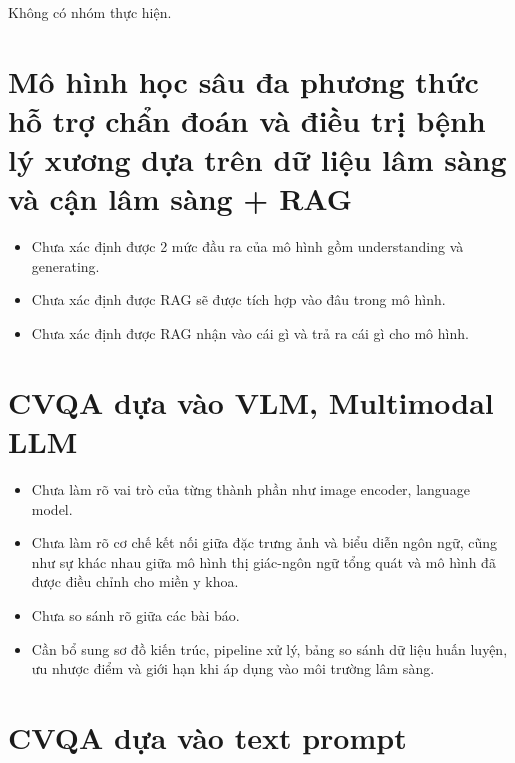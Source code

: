 Không có nhóm thực hiện.


\section*{Mô hình học sâu đa phương thức hỗ trợ chẩn đoán và điều trị bệnh lý xương dựa trên dữ liệu lâm sàng và cận lâm sàng + RAG}

\begin{itemize}
    \item Chưa xác định được 2 mức đầu ra của mô hình gồm understanding và generating.

    \item Chưa xác định được RAG sẽ được tích hợp vào đâu trong mô hình.

    \item Chưa xác định được RAG nhận vào cái gì và trả ra cái gì cho mô hình.
\end{itemize}


\section*{CVQA dựa vào VLM, Multimodal LLM}

\begin{itemize}
    \item Chưa làm rõ vai trò của từng thành phần như image encoder, language model.

    \item Chưa làm rõ cơ chế kết nối giữa đặc trưng ảnh và biểu diễn ngôn ngữ, cũng như sự khác nhau giữa mô hình thị giác-ngôn ngữ tổng quát và mô hình đã được điều chỉnh cho miền y khoa.
    
    \item Chưa so sánh rõ giữa các bài báo.

    \item Cần bổ sung sơ đồ kiến trúc, pipeline xử lý, bảng so sánh dữ liệu huấn luyện, ưu nhược điểm và giới hạn khi áp dụng vào môi trường lâm sàng.
\end{itemize}

\section*{CVQA dựa vào text prompt}

